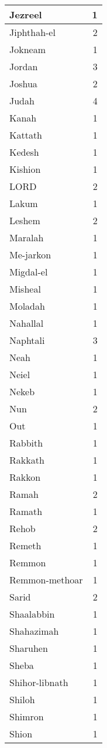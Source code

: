 \begin{center}
\begin{longtable}{l|r}
Jezreel & 1\\ \hline 
Jiphthah-el & 2\\ \hline 
Jokneam & 1\\ \hline 
Jordan & 3\\ \hline 
Joshua & 2\\ \hline 
Judah & 4\\ \hline 
Kanah & 1\\ \hline 
Kattath & 1\\ \hline 
Kedesh & 1\\ \hline 
Kishion & 1\\ \hline 
LORD & 2\\ \hline 
Lakum & 1\\ \hline 
Leshem & 2\\ \hline 
Maralah & 1\\ \hline 
Me-jarkon & 1\\ \hline 
Migdal-el & 1\\ \hline 
Misheal & 1\\ \hline 
Moladah & 1\\ \hline 
Nahallal & 1\\ \hline 
Naphtali & 3\\ \hline 
Neah & 1\\ \hline 
Neiel & 1\\ \hline 
Nekeb & 1\\ \hline 
Nun & 2\\ \hline 
Out & 1\\ \hline 
Rabbith & 1\\ \hline 
Rakkath & 1\\ \hline 
Rakkon & 1\\ \hline 
Ramah & 2\\ \hline 
Ramath & 1\\ \hline 
Rehob & 2\\ \hline 
Remeth & 1\\ \hline 
Remmon & 1\\ \hline 
Remmon-methoar & 1\\ \hline 
Sarid & 2\\ \hline 
Shaalabbin & 1\\ \hline 
Shahazimah & 1\\ \hline 
Sharuhen & 1\\ \hline 
Sheba & 1\\ \hline 
Shihor-libnath & 1\\ \hline 
Shiloh & 1\\ \hline 
Shimron & 1\\ \hline 
Shion & 1\\ \hline 

\end{longtable}
\end{center}

